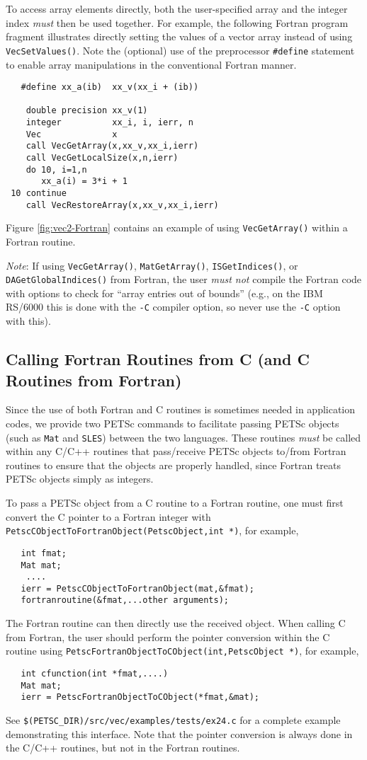 To access array elements directly, both the user-specified array and
the integer index {\em must} then be used together.  
For example, the following Fortran program fragment illustrates
directly setting the values of a vector array instead of using {\tt
VecSetValues()}.  Note the (optional) use of the preprocessor 
{\tt \#define} statement to enable array manipulations in the conventional
Fortran manner.
\begin{verbatim}
   #define xx_a(ib)  xx_v(xx_i + (ib))

    double precision xx_v(1)
    integer          xx_i, i, ierr, n
    Vec              x
    call VecGetArray(x,xx_v,xx_i,ierr)
    call VecGetLocalSize(x,n,ierr)
    do 10, i=1,n
       xx_a(i) = 3*i + 1
 10 continue
    call VecRestoreArray(x,xx_v,xx_i,ierr)
\end{verbatim}
Figure \ref{fig:vec2-Fortran} contains an example of using {\tt VecGetArray()}
within a Fortran routine.

{\em Note}: If using {\tt VecGetArray()}, {\tt MatGetArray()}, {\tt ISGetIndices()},
or {\tt DAGetGlobalIndices()}
from Fortran, the user {\em must not} compile the Fortran code with options 
to check for ``array entries out of bounds'' (e.g., on the IBM RS/6000 this 
is done with the {\tt -C} compiler option, so never use the {\tt -C} option with this).

\subsection{Calling Fortran Routines from C (and C Routines from Fortran)}

Since the use of both Fortran and C routines is sometimes needed in
application codes, we provide two PETSc commands to facilitate passing
PETSc objects (such as {\tt Mat} and {\tt SLES}) between the two
languages.  These routines {\em must} be called within any C/C++
routines that pass/receive PETSc objects to/from Fortran routines to
ensure that the objects are properly handled, since Fortran treats PETSc
objects simply as integers.

To pass a PETSc object from a C routine to a Fortran routine, one must
first convert the C pointer to a Fortran integer with {\tt
PetscCObjectToFortranObject(PetscObject,int *)}, for example,
\begin{verbatim}
   int fmat;
   Mat mat;
    ....
   ierr = PetscCObjectToFortranObject(mat,&fmat);
   fortranroutine(&fmat,...other arguments);
\end{verbatim}
The Fortran routine can then directly use the received object.
When calling C from Fortran, the user should perform the 
pointer conversion within the C routine using
{\tt PetscFortranObjectToCObject(int,PetscObject *)}, for example,
\begin{verbatim}
   int cfunction(int *fmat,....)
   Mat mat;
   ierr = PetscFortranObjectToCObject(*fmat,&mat);
\end{verbatim}
See {\tt \$(PETSC\_DIR)/src/vec/examples/tests/ex24.c} for a complete
example demonstrating this interface.  Note that the pointer
conversion is always done in the C/C++ routines, but not
in the Fortran routines.

